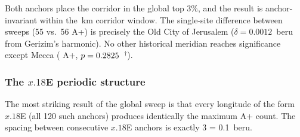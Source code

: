\documentclass[12pt,a4paper]{article}
\begin{document}
\begin{table}[H]
\centering\small
\caption{Global anchor sweep: both Levantine anchors ranked within their
  own corpus. Each sweep: \anchorSweepNanchors{} trial anchors,
  0--360\textdegree{}E at 0.01\textdegree{} resolution.
  Sweep~A: N\,=\,1010 (Jerusalem removed); Sweep~B: N\,=\,1010 (Jerusalem self-excluded).
  Gerizim is external in both.
  Mean A+ across all anchors: \anchorSweepApMean{}$\pm$\anchorSweepApStd{}.}
\label{tab:sweep_summary}
\end{table}

Both anchors place the corridor in the global top 3\%, and the result
is anchor-invariant within the \GerizimJerusalemKm\,km corridor window.
The single-site difference between sweeps (55 vs.\ 56 A+) is precisely
the Old City of Jerusalem ($\delta = 0.0012$~beru from Gerizim's
harmonic). No other historical meridian reaches significance except
Mecca (\MeccaAp{} A+, $p = 0.2825$~$^\dagger$).

\subsubsection*{The $x.18$\textdegree{}E periodic structure}
\label{sec:x18artifact}

The most striking result of the global sweep is that every longitude of
the form $x.18$\textdegree{}E (all 120 such anchors) produces identically
the maximum A+ count. The spacing between consecutive $x.18$\textdegree{}E
anchors is exactly 3\textdegree{} = 0.1~beru.
\end{document}
